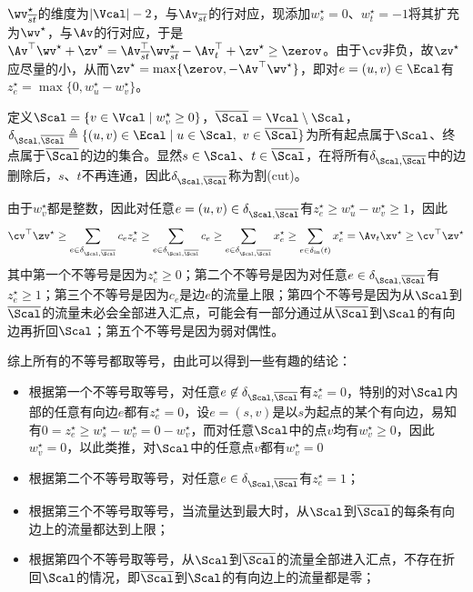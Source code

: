\documentclass{ctexart}
\begin{document}
$\wv_{\overline{st}}^\star$的维度为$|\Vcal| - 2$，与$\Av_{\overline{st}}$的行对应，现添加$w_s^\star = 0$、$w_t^\star = -1$将其扩充为$\wv^\star$，与$\Av$的行对应，于是$\Av^\top \wv^\star + \zv^\star = \Av_{\overline{st}}^\top \wv_{\overline{st}}^\star - \Av_t^\top + \zv^\star \ge \zerov$。由于$\cv$非负，故$\zv^\star$应尽量的小，从而$\zv^\star = \max \{ \zerov, - \Av^\top \wv^\star \}$，即对$e = (u,v) \in \Ecal$有$z^\star_e = \max \{ 0, w_u^\star - w_v^\star \}$。

定义$\Scal = \{ v \in \Vcal \mid w_v^\star \ge 0 \}$，$\overline{\Scal} = \Vcal \setminus \Scal$，$\delta_{\Scal, \overline{\Scal}} \triangleq \{ (u,v) \in \Ecal \mid u \in \Scal, ~ v \in \overline{\Scal} \}$为所有起点属于$\Scal$、终点属于$\overline{\Scal}$的边的集合。显然$s \in \Scal$、$t \in \overline{\Scal}$，在将所有$\delta_{\Scal, \overline{\Scal}}$中的边删除后，$s$、$t$不再连通，因此$\delta_{\Scal, \overline{\Scal}}$称为割(cut)。

由于$w_v^\star$都是整数，因此对任意$e = (u,v) \in \delta_{\Scal, \overline{\Scal}}$有$z_e^\star \ge w_u^\star - w_v^\star \ge 1$，因此
\begin{align*}
    \cv^\top \zv^\star \ge \sum_{e \in \delta_{\Scal, \overline{\Scal}}} c_e z_e^\star \ge \sum_{e \in \delta_{\Scal, \overline{\Scal}}} c_e \ge \sum_{e \in \delta_{\Scal, \overline{\Scal}}} x_e^\star \ge \sum_{e \in \delta_{\text{in}}(t)} x_e^\star = \Av_t \xv^\star \ge \cv^\top \zv^\star
\end{align*}
其中第一个不等号是因为$z_e^\star \ge 0$；第二个不等号是因为对任意$e \in \delta_{\Scal, \overline{\Scal}}$有$z_e^\star \ge 1$；第三个不等号是因为$c_e$是边$e$的流量上限；第四个不等号是因为从$\Scal$到$\overline{\Scal}$的流量未必会全部进入汇点，可能会有一部分通过从$\overline{\Scal}$到$\Scal$的有向边再折回$\Scal$；第五个不等号是因为弱对偶性。

综上所有的不等号都取等号，由此可以得到一些有趣的结论：
\begin{itemize}
    \item 根据第一个不等号取等号，对任意$e \not \in \delta_{\Scal, \overline{\Scal}}$有$z_e^\star = 0$，特别的对$\Scal$内部的任意有向边$e$都有$z_e^\star = 0$，设$e = (s,v)$是以$s$为起点的某个有向边，易知有$0 = z_e^\star \ge w_s^\star - w_v^\star = 0 - w_v^\star$，而对任意$\Scal$中的点$v$均有$w_v^\star \ge 0$，因此$w_v^\star = 0$，以此类推，对$\Scal$中的任意点$v$都有$w_v^\star = 0$
    \item 根据第二个不等号取等号，对任意$e \in \delta_{\Scal, \overline{\Scal}}$有$z_e^\star = 1$；
    \item 根据第三个不等号取等号，当流量达到最大时，从$\Scal$到$\overline{\Scal}$的每条有向边上的流量都达到上限；
    \item 根据第四个不等号取等号，从$\Scal$到$\overline{\Scal}$的流量全部进入汇点，不存在折回$\Scal$的情况，即$\overline{\Scal}$到$\Scal$的有向边上的流量都是零；
\end{itemize}
\end{document}
